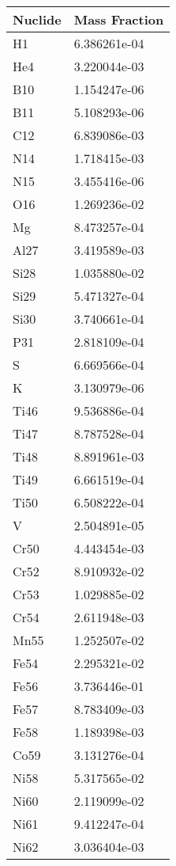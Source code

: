 \begin{centering}
\begin{longtable}[ht!]
\caption{Table showing the isotopic description of material EppDucts}
\label{table:material_EppDucts}
\end{longtable}\clearpage

\begin{longtable}[ht!]
{ p{} | p{} }
\hline
Nuclide & Mass Fraction\\
\hline
H1 & 6.386261e-04\\
He4 & 3.220044e-03\\
B10 & 1.154247e-06\\
B11 & 5.108293e-06\\
C12 & 6.839086e-03\\
N14 & 1.718415e-03\\
N15 & 3.455416e-06\\
O16 & 1.269236e-02\\
Mg & 8.473257e-04\\
Al27 & 3.419589e-03\\
Si28 & 1.035880e-02\\
Si29 & 5.471327e-04\\
Si30 & 3.740661e-04\\
P31 & 2.818109e-04\\
S & 6.669566e-04\\
K & 3.130979e-06\\
Ti46 & 9.536886e-04\\
Ti47 & 8.787528e-04\\
Ti48 & 8.891961e-03\\
Ti49 & 6.661519e-04\\
Ti50 & 6.508222e-04\\
V & 2.504891e-05\\
Cr50 & 4.443454e-03\\
Cr52 & 8.910932e-02\\
Cr53 & 1.029885e-02\\
Cr54 & 2.611948e-03\\
Mn55 & 1.252507e-02\\
Fe54 & 2.295321e-02\\
Fe56 & 3.736446e-01\\
Fe57 & 8.783409e-03\\
Fe58 & 1.189398e-03\\
Co59 & 3.131276e-04\\
Ni58 & 5.317565e-02\\
Ni60 & 2.119099e-02\\
Ni61 & 9.412247e-04\\
Ni62 & 3.036404e-03\\

\end{longtable}
\end{centering}
